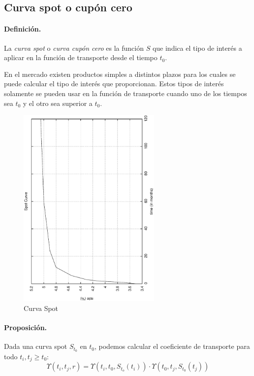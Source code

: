 \subsection{Curva spot o cup\'on cero}

\paragraph{Definici\'on.} La \emph{curva spot} o
\emph{curva cup\'on cero} es la funci\'on
$S$ que indica el tipo de inter\'es a aplicar en la funci\'on de transporte
desde el tiempo $t_0$.

En el mercado existen productos simples a distintos plazos para los cuales se 
puede calcular el tipo de inter\'es que proporcionan. Estos tipos de inter\'es
solamente se pueden usar en la funci\'on de transporte cuando uno de los
tiempos sea $t_0$ y el otro sea superior a $t_0$.

\begin{figure}[!hb]
\begin{center}
\includegraphics[height=10cm, angle=-90]{./images/spot.ps}
\caption{Curva Spot}
\label{spot}
\end{center}
\end{figure}

\paragraph{Proposici\'on.} Dada una curva spot $S_{t_0}$ en $t_0$, podemos calcular
el coeficiente de transporte para todo $t_i, t_j \ge t_0$:
\begin{displaymath}
\Upsilon(t_i,t_j, r) = 
\Upsilon(t_i,t_0, S_{t_o}(t_i)) \cdot \Upsilon(t_0,t_j, S_{t_0}(t_j))
\end{displaymath}


